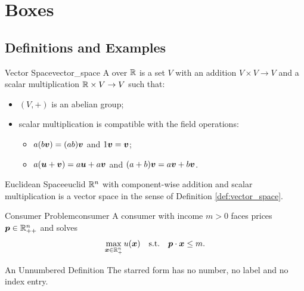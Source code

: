 \chapter{Boxes}
%
%
%
\section{Definitions and Examples}
%
\begin{defbox}{Vector Space}{vector_space}
A  over $\mathbb{R}$ is a set $V$ with an addition $V\times V\to V$ and a scalar multiplication $\mathbb{R}\times V\to V$ such that:
\begin{itemize}
    \item $(V,+)$ is an abelian group;
    \item scalar multiplication is compatible with the field operations:
    \begin{itemize}
        \item $a(b\boldsymbol v)=(ab)\boldsymbol v$ and $1\boldsymbol v=\boldsymbol v$;
        \item $a(\boldsymbol u+\boldsymbol v)=a\boldsymbol u+a\boldsymbol v$ and $(a+b)\boldsymbol v=a\boldsymbol v+b\boldsymbol v$.
    \end{itemize}
\end{itemize}
\end{defbox}
%
\begin{exbox}{Euclidean Space}{euclid}
$\mathbb{R}^n$ with component-wise addition and scalar multiplication is a vector space in the sense of Definition \ref{def:vector_space}.
\end{exbox}
%
\begin{stbox}{Consumer Problem}{consumer}
A consumer with income $m>0$ faces prices $\boldsymbol p\in\mathbb{R}^n_{++}$ and solves
\[
\max_{\boldsymbol x\in\mathbb{R}^n_+} u(\boldsymbol x)\quad\text{s.t.}\quad \boldsymbol p\cdot\boldsymbol x\le m.
\]
\end{stbox}
%
\begin{defbox*}{An Unnumbered Definition}
The starred form has no number, no label and no index entry.
\end{defbox*}
%

